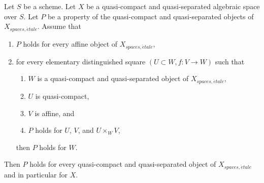 \begin{lemma}
\label{lemma-induction-principle}
Let $S$ be a scheme. Let $X$ be a quasi-compact and quasi-separated
algebraic space over $S$. Let $P$ be a property of the quasi-compact
and quasi-separated objects of $X_{spaces, \acute{e}tale}$. Assume that
\begin{enumerate}
\item $P$ holds for every affine object of $X_{spaces, \acute{e}tale}$,
\item for every elementary distinguished square $(U \subset W, f : V \to W)$
such that
\begin{enumerate}
\item $W$ is a quasi-compact and quasi-separated object of
$X_{spaces, \acute{e}tale}$,
\item $U$ is quasi-compact,
\item $V$ is affine, and
\item $P$ holds for $U$, $V$, and $U \times_W V$,
\end{enumerate}
then $P$ holds for $W$.
\end{enumerate}
Then $P$ holds for every quasi-compact and quasi-separated object
of $X_{spaces, \acute{e}tale}$ and in particular for $X$.
\end{lemma}

